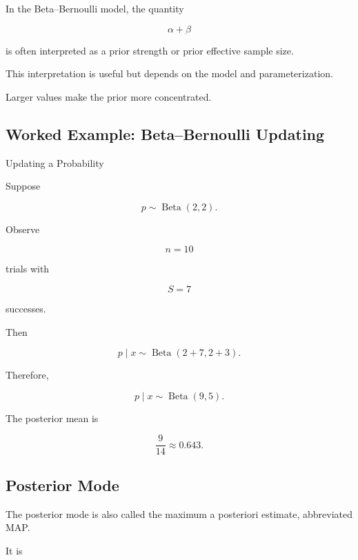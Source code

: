 In the Beta--Bernoulli model, the quantity

\[
\boxed{
\alpha+\beta
}
\]

is often interpreted as a prior strength or prior effective sample size.

This interpretation is useful but depends on the model and
parameterization.

Larger values make the prior more concentrated.

\subsection{Worked Example: Beta--Bernoulli Updating}
\label{subsec:worked-beta-bernoulli}

\begin{workedexamplebox}{Updating a Probability}

Suppose

\[
p
\sim
\operatorname{Beta}(2,2).
\]

Observe

\[
n=10
\]

trials with

\[
S=7
\]

successes.

Then

\[
p\mid x
\sim
\operatorname{Beta}
(
2+7,
2+3
).
\]

Therefore,

\begin{answerbox}
\[
\boxed{
p\mid x
\sim
\operatorname{Beta}(9,5).
}
\]

The posterior mean is

\[
\boxed{
\frac9{14}
\approx
0.643.
}
\]
\end{answerbox}

\end{workedexamplebox}

\subsection{Posterior Mode}
\label{subsec:posterior-mode}

The posterior mode is also called the maximum a posteriori estimate,
abbreviated MAP.

It is

